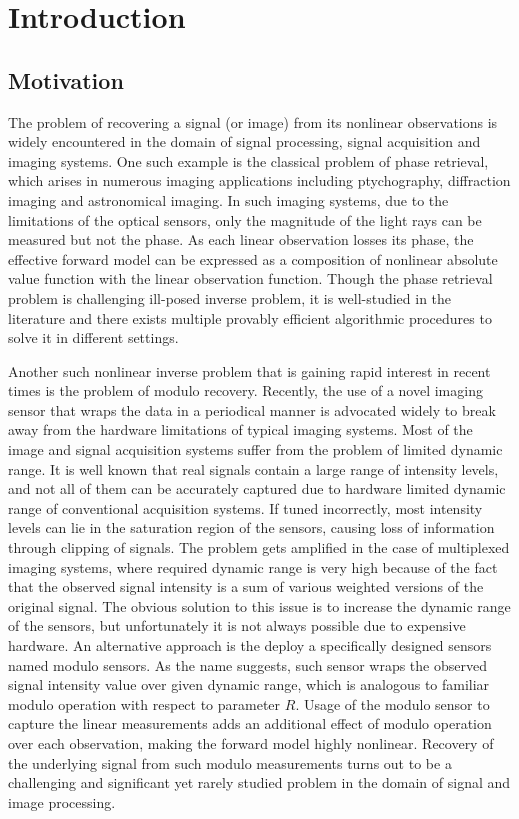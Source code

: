 \section{Introduction}
\label{sec:intro}
\subsection{Motivation}
The problem of recovering a signal (or image) from its nonlinear observations is widely encountered in the domain of signal processing, signal acquisition and imaging systems. One such example is the classical problem of phase retrieval, which arises in numerous imaging applications including ptychography, diffraction imaging and astronomical imaging. In such imaging systems, due to the limitations of the optical sensors, only the magnitude of the light rays can be measured but not the phase. As each linear observation losses its phase, the effective forward model can be expressed as a composition of nonlinear absolute value function with the linear observation function. Though the phase retrieval problem is challenging ill-posed inverse problem, it is well-studied in the literature and there exists multiple provably efficient algorithmic procedures to solve it in different settings. \cite{}

Another such nonlinear inverse problem that is gaining rapid interest in recent times is the problem of modulo recovery. Recently, the use of a novel imaging sensor that wraps the data in a periodical manner is advocated widely to break away from the hardware limitations of typical imaging systems. Most of the image and signal acquisition systems suffer from the problem of limited dynamic range. It is well known that real signals contain a large range of intensity levels, and not all of them can be accurately captured due to hardware limited dynamic range of conventional acquisition systems. If tuned incorrectly, most intensity levels can lie in the saturation region of the sensors, causing loss of information through clipping of signals. The problem gets amplified in the case of multiplexed imaging systems, where required dynamic range is very high because of the fact that the observed signal intensity is a sum of various weighted versions of the original signal. The obvious solution to this issue is to increase the dynamic range of the sensors, but unfortunately it is not always possible due to expensive hardware. An alternative approach is the deploy a specifically designed sensors named modulo sensors. As the name suggests, such sensor wraps the observed signal intensity value over given dynamic range, which is analogous to familiar modulo operation with respect to parameter $R$. Usage of the modulo sensor to capture the linear measurements adds an additional effect of modulo operation over each observation, making the forward model highly nonlinear. Recovery of the underlying signal from such modulo measurements turns out to be a challenging and significant yet rarely studied problem in the domain of signal and image processing. 


